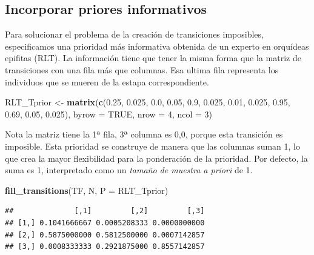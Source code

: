 \documentclass[
]{book}
\newenvironment{Shaded}{\begin{snugshade}}{\end{snugshade}}
\newcommand{\AttributeTok}[1]{\textcolor[rgb]{0.13,0.29,0.53}{#1}}
\newcommand{\ConstantTok}[1]{\textcolor[rgb]{0.56,0.35,0.01}{#1}}
\newcommand{\DecValTok}[1]{\textcolor[rgb]{0.00,0.00,0.81}{#1}}
\newcommand{\FloatTok}[1]{\textcolor[rgb]{0.00,0.00,0.81}{#1}}
\newcommand{\FunctionTok}[1]{\textcolor[rgb]{0.13,0.29,0.53}{\textbf{#1}}}
\newcommand{\NormalTok}[1]{#1}
\newcommand{\OtherTok}[1]{\textcolor[rgb]{0.56,0.35,0.01}{#1}}
\theoremstyle{definition}
\theoremstyle{definition}
\theoremstyle{definition}
\theoremstyle{definition}
\theoremstyle{remark}
\begin{document}
\hypertarget{incorporar-priores-informativos}{%
\subsection{Incorporar priores informativos}\label{incorporar-priores-informativos}}

Para solucionar el problema de la creación de transiciones imposibles,
especificamos una prioridad más informativa obtenida de un experto en
orquídeas epifitas (RLT). La información tiene que tener la misma forma
que la matriz de transiciones con una fila más que columnas. Esa ultima
fila representa los individuos que se mueren de la estapa
correspondiente.

\begin{Shaded}
\begin{Highlighting}[]
\NormalTok{RLT\_Tprior }\OtherTok{\textless{}{-}} \FunctionTok{matrix}\NormalTok{(}\FunctionTok{c}\NormalTok{(}\FloatTok{0.25}\NormalTok{, }\FloatTok{0.025}\NormalTok{, }\FloatTok{0.0}\NormalTok{,}
                       \FloatTok{0.05}\NormalTok{, }\FloatTok{0.9}\NormalTok{,   }\FloatTok{0.025}\NormalTok{,}
                       \FloatTok{0.01}\NormalTok{, }\FloatTok{0.025}\NormalTok{, }\FloatTok{0.95}\NormalTok{,}
                       \FloatTok{0.69}\NormalTok{, }\FloatTok{0.05}\NormalTok{,  }\FloatTok{0.025}\NormalTok{), }
                     \AttributeTok{byrow =} \ConstantTok{TRUE}\NormalTok{, }\AttributeTok{nrow =} \DecValTok{4}\NormalTok{, }\AttributeTok{ncol =} \DecValTok{3}\NormalTok{)}
\end{Highlighting}
\end{Shaded}

Nota la matriz tiene la 1ª fila, 3ª columna es 0,0, porque esta
transición es imposible. Esta prioridad se construye de manera que las
columnas suman 1, lo que crea la mayor flexibilidad para la ponderación
de la prioridad. Por defecto, la suma es 1, interpretado como un \emph{tamaño
de muestra a priori} de 1.

\begin{Shaded}
\begin{Highlighting}[]
\FunctionTok{fill\_transitions}\NormalTok{(TF, N, }\AttributeTok{P =}\NormalTok{ RLT\_Tprior)}
\end{Highlighting}
\end{Shaded}

\begin{verbatim}
##              [,1]         [,2]         [,3]
## [1,] 0.1041666667 0.0005208333 0.0000000000
## [2,] 0.5875000000 0.5812500000 0.0007142857
## [3,] 0.0008333333 0.2921875000 0.8557142857
\end{verbatim}
\end{document}
